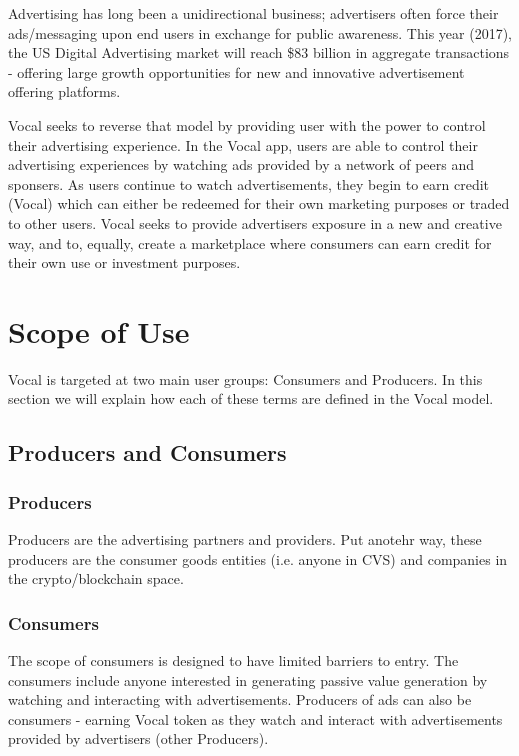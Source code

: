 \documentclass[conference]{IEEEtran}
\begin{document}
    Advertising has long been a unidirectional business; advertisers often force their ads/messaging upon end users in exchange for public awareness.
    This year (2017), the US Digital Advertising market will reach \$83 billion in aggregate transactions - offering large growth opportunities for new and innovative advertisement offering platforms.
    
    Vocal seeks to reverse that model by providing user with the power to control their advertising experience.
    In the Vocal app, users are able to control their advertising experiences by watching ads provided by a network of peers and sponsers. As users continue to watch advertisements, they begin to earn credit (Vocal) which can either be redeemed for their own marketing purposes or traded to other users. 
    Vocal seeks to provide advertisers exposure in a new and creative way, and to, equally, create a marketplace where consumers can earn credit for their own use or investment purposes.

    \section{Scope of Use}

    Vocal is targeted at two main user groups: Consumers and Producers. In this section we will explain how each of these terms are defined in the Vocal model.

    \subsection{Producers and Consumers}

    \subsubsection{Producers} Producers are the advertising partners and providers. Put anotehr way, these producers are the consumer goods entities (i.e. anyone in CVS) and companies in the crypto/blockchain space.

    \subsubsection{Consumers} The scope of consumers is designed to have limited barriers to entry. The consumers include anyone interested in generating passive value generation by watching and interacting with advertisements. Producers of ads can also be consumers - earning Vocal token as they watch and interact with advertisements provided by advertisers (other Producers).
\end{document}
